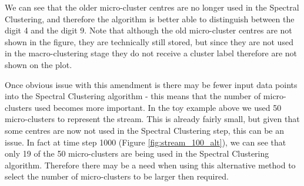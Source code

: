 We can see that the older micro-cluster centres are no longer used in the Spectral Clustering, and therefore the algorithm is better able to distinguish between the digit 4 and the digit 9. Note that although the old micro-cluster centres are not shown in the figure, they are technically still stored, but since they are not used in the macro-clustering stage they do not receive a cluster label therefore are not shown on the plot. 

Once obvious issue with this amendment is there may be fewer input data points into the Spectral Clustering algorithm - this means that the number of micro-clusters used becomes more important.  In the toy example above we used 50 micro-clusters to represent the stream. This is already fairly small, but given that some centres are now not used in the Spectral Clustering step, this can be an issue. In fact at time step 1000 (Figure \ref{fig:stream_100_alt}), we can see that only 19 of the 50 micro-clusters are being used in the Spectral Clustering algorithm. Therefore there may be a need when using this alternative method to select the number of micro-clusters to be larger then required.  



